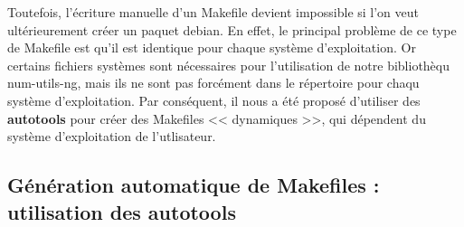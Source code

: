 Toutefois, l'\'ecriture manuelle d'un Makefile devient impossible si l'on veut ult\'erieurement cr\'eer un paquet debian.
En effet, le principal probl\`eme de ce type de Makefile est qu'il est identique pour chaque syst\`eme d'exploitation. Or certains fichiers
syst\`emes sont n\'ecessaires pour l'utilisation de notre biblioth\`equ num-utils-ng, mais ils ne sont pas forc\'ement dans le r\'epertoire pour
chaqu syst\`eme d'exploitation.
\newline 	
Par cons\'equent, il nous a \'et\'e propos\'e d'utiliser des \textbf{autotools} pour cr\'eer des Makefiles << dynamiques >>, qui d\'ependent du syst\`eme
d'exploitation de l'utlisateur.

\subsection{G\'en\'eration automatique de Makefiles : utilisation des autotools}


